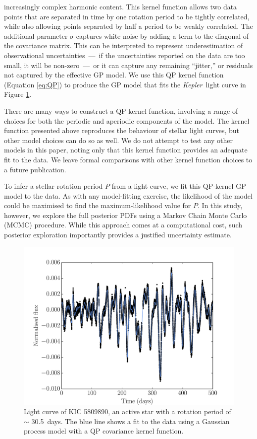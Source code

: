 \documentclass[a4paper,fleqn,usenatbib,useAMS]{mnras}
\newcommand{\Kepler}{{\it Kepler}}
\newcommand{\kepexample}{5809890}
\newcommand{\kepexampleperiod}{30.5}
\begin{document}
increasingly complex harmonic content.
This kernel function allows two data points that are separated in time by one
rotation period to be tightly correlated, while also allowing
points separated by half a period to be weakly correlated.
The additional parameter $\sigma$ captures white noise by adding
a term to the diagonal of the covariance matrix.
This can be interpreted to represent underestimation of observational
uncertainties~---~if the uncertainties reported on the data are too small, it
will be non-zero~---~or it can capture any remaining ``jitter,'' or residuals
not captured by the effective GP model.
We use this QP kernel function (Equation \ref{eq:QP}) to produce
the GP model that fits the \Kepler\ light curve in Figure
\ref{fig:GP_example}.

There are many ways to construct a QP kernel function, involving a range of
choices for both the periodic and aperiodic components of the model.
The kernel function presented above reproduces the behaviour of stellar light
curves, but other model choices can do so as well.
We do not attempt to test any other models in this paper, noting only that
this kernel function provides an adequate fit to the data.
We leave formal comparisons with other kernel function choices to a future
publication.

To infer a stellar rotation period $P$ from a light curve, we fit this
QP-kernel GP model to the data.  As with any model-fitting exercise, the
likelihood
of the model could be maximised to find the maximum-likelihood value for $P$.
In this study, however, we explore the full posterior PDFs using a Markov
Chain Monte Carlo (MCMC) procedure.  While
this approach comes at a computational cost, such posterior exploration
importantly provides a justified uncertainty estimate.

\begin{figure}
\begin{center}
\includegraphics[width=\columnwidth, clip=true]{figures/koi_lc_demo.pdf}
\caption[A light curve with a GP model.]
{Light curve of KIC \kepexample, an active star with a rotation period of
$\sim$ \kepexampleperiod\ days.
The blue line shows a fit to the data using a Gaussian process model with a QP
covariance kernel function.}
\label{fig:GP_example}
\end{center}
\end{figure}
\end{document}
